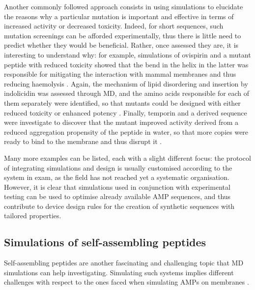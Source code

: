 Another commonly followed approach consists in using simulations to elucidate the reasons why a particular mutation is important and effective in terms of increased activity or decreased toxicity. Indeed, for short sequences, such mutation screenings can be afforded experimentally, thus there is little need to predict whether they would be beneficial. Rather, once assessed they are, it is interesting to understand why: for example, simulations of ovispirin and a mutant peptide with reduced toxicity showed that the bend in the helix in the latter was responsible for mitigating the interaction with mammal membranes and thus reducing haemolysis \citep{Khandelia2005}. Again, the mechanism of lipid disordering and insertion by indolicidin was assessed through MD, and the amino acids responsible for each of them separately were identified, so that mutants could be designed with either reduced toxicity or enhanced potency \citep{Tsai2009}. Finally, temporin and a derived sequence were investigate to discover that the mutant improved activity derived from a reduced aggregation propensity of the peptide in water, so that more copies were ready to bind to the membrane and thus disrupt it \citep{Farrotti2017}.

Many more examples can be listed, each with a slight different focus: the protocol of integrating simulations and design is usually customised according to the system in exam, as the field has not reached yet a systematic organisation.
%
However, it is clear that simulations used in conjunction with experimental testing can be used to optimise  already available AMP sequences, and thus contribute to device design rules for the creation of synthetic sequences with tailored properties.


\subsection{Simulations of self-assembling peptides}
Self-assembling peptides are another fascinating and challenging topic that MD simulations can help investigating. Simulating such systems implies different challenges with respect to the ones faced when simulating AMPs on membranes \citep{Frederix2018,Orsi2018}.

